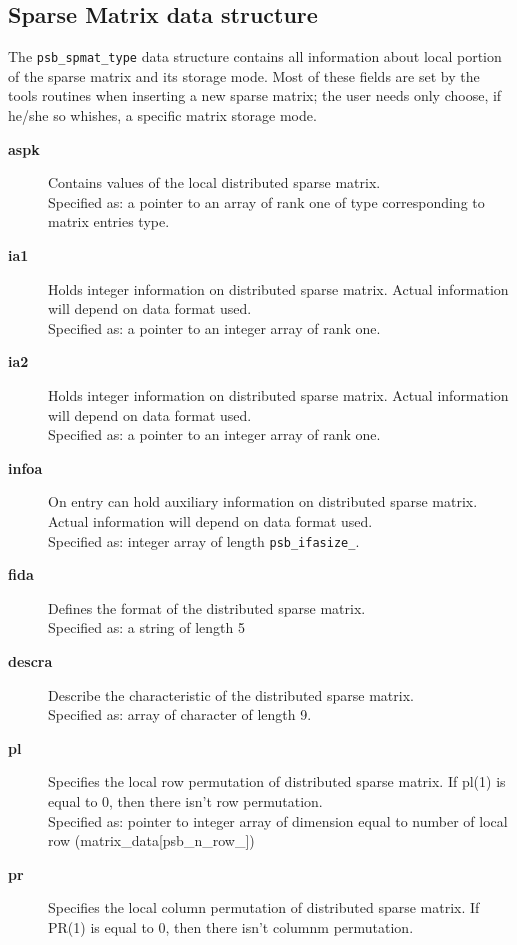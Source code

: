 \subsection{Sparse Matrix data structure}
\label{sec:spmat}
The \hypertarget{spdata}{{\tt psb\_spmat\_type}} data structure
contains all information about local portion of the sparse matrix and   
its storage mode. Most  of these fields are set  by the tools
routines when inserting a new sparse matrix; the user needs only
choose, if he/she so whishes, a specific matrix storage mode. \\
\begin{description}
\item[{\bf aspk}] Contains values of the local distributed sparse
matrix.\\
Specified as: a pointer to an array of rank one of type corresponding
to matrix entries type.
\item[{\bf ia1}] Holds integer information on distributed sparse
matrix. Actual information will depend on data format used.\\
Specified as: a pointer to an integer array of rank one.
\item[{\bf ia2}] Holds integer information on distributed sparse
matrix. Actual information will depend on data format used.\\
Specified as: a pointer to an integer array of rank one.
\item[{\bf infoa}] On entry can hold auxiliary information on distributed sparse
matrix.  Actual information will depend on data format used.\\
Specified as: integer array of length \verb|psb_ifasize_|.
\item[{\bf fida}] Defines the format of the distributed sparse matrix.\\
Specified as: a string of length 5
\item[{\bf descra}] Describe the characteristic of the distributed sparse matrix.\\
Specified as: array of character of length 9.
\item[{\bf pl}] Specifies the local row permutation of distributed sparse
matrix. If pl(1) is equal to 0, then there isn't row permutation.\\
Specified as: pointer to integer array of dimension equal to number of local row (matrix\_data[psb\_n\_row\_\hbox{]})
\item[{\bf pr}] Specifies the local column permutation of distributed sparse
matrix. If PR(1) is equal to 0, then there isn't columnm permutation.\\

\end{description}
